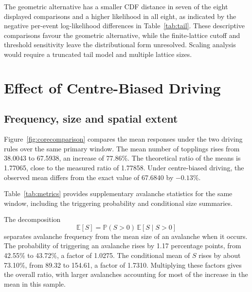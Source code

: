 \documentclass[11pt,a4paper,oneside]{report}
\newcommand{\E}{\mathbb{E}}
\newcommand{\Prob}{\mathbb{P}}
\numberwithin{equation}{chapter}
\begin{document}


The geometric alternative has a smaller CDF distance in seven of the eight displayed comparisons and a higher likelihood in all eight, as indicated by the negative per-event log-likelihood differences in Table~\ref{tab:tail}. These descriptive comparisons favour the geometric alternative, while the finite-lattice cutoff and threshold sensitivity leave the distributional form unresolved. Scaling analysis would require a truncated tail model and multiple lattice sizes.
\FloatBarrier

\chapter{Effect of Centre-Biased Driving}
\label{ch:extension}
\section{Frequency, size and spatial extent}
\label{sec:comparison}
Figure~\ref{fig:corecomparison} compares the mean responses under the two driving rules over the same primary window. The mean number of topplings rises from 38.0043 to 67.5938, an increase of 77.86\%. The theoretical ratio of the means is 1.77065, close to the measured ratio of 1.77858. Under centre-biased driving, the observed mean differs from the exact value of 67.6840 by $-0.13\%$.



Table~\ref{tab:metrics} provides supplementary avalanche statistics for the same window, including the triggering probability and conditional size summaries.


\begin{samepage}
The decomposition
\begin{equation}
 \E[S]=\Prob(S>0)\,\E[S\mid S>0]
 \label{eq:decomposition}
\end{equation}
separates avalanche frequency from the mean size of an avalanche when it occurs. The probability of triggering an avalanche rises by 1.17 percentage points, from 42.55\% to 43.72\%, a factor of 1.0275. The conditional mean of $S$ rises by about 73.10\%, from 89.32 to 154.61, a factor of 1.7310. Multiplying these factors gives the overall ratio, with larger avalanches accounting for most of the increase in the mean in this sample.

\end{samepage}
\end{document}
